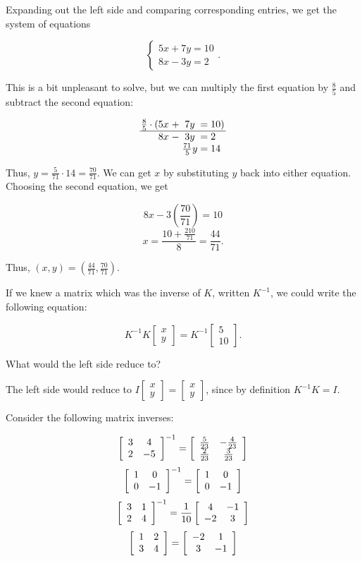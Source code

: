 \documentclass[../key.tex]{subfiles}
\begin{document}
Expanding out the left side and comparing corresponding entries, we get the system of equations

$$\begin{cases} 5x+7y = 10 \\ 8x-3y =2 \end{cases}.$$

This is a bit unpleasant to solve, but we can multiply the first equation by $\frac{8}{5}$ and subtract the second equation:

$$\arraycolsep=1.4pt\begin{array}{rcccl}
\frac{8}{5}\cdot (5x & + & 7y & = & 10) \\ \hline
8x & - & 3y & = & 2 \\
& & \frac{71}{5}y & = & 14 \\
\end{array}$$

Thus, $y=\frac{5}{71}\cdot 14 = \frac{70}{71}$. We can get $x$ by substituting $y$ back into either equation. Choosing the second equation, we get

$$8x-3\left(\frac{70}{71}\right)=10$$
$$x = \frac{10 + \frac{210}{71}}{8} = \frac{44}{71}.$$

Thus, $(x,y)=\left(\frac{44}{71},\frac{70}{71}\right)$.

\begin{inner_problem}
\item If we knew a matrix which was the inverse of $K$, written $K^{-1}$, we could write the following equation:

$$K^{-1}K\left[\begin{array}{c} x \\ y \end{array}\right]=K^{-1}\left[\begin{array}{c} 5 \\ 10 \end{array}\right].$$

What would the left side reduce to?
\end{inner_problem}

The left side would reduce to $I\left[\begin{array}{c} x \\ y \end{array}\right]=\left[\begin{array}{c} x \\ y \end{array}\right]$, since by definition $K^{-1}K=I$.

\begin{outer_problem}
\item Consider the following matrix inverses:

$$\left[\begin{array}{cc} 3 & 4 \\ 2 & -5 \end{array}\right]^{-1}=\left[\begin{array}{cc} \frac{5}{23} & -\frac{4}{23} \\ \frac{2}{23} & \frac{3}{23} \end{array}\right]$$
$$\left[\begin{array}{cc} 1 & 0 \\ 0 & -1 \end{array}\right]^{-1}=\left[\begin{array}{cc} 1 & 0 \\ 0 & -1 \end{array}\right]$$
$$\left[\begin{array}{cc} 3 & 1 \\ 2 & 4 \end{array}\right]^{-1}=\frac{1}{10}\left[\begin{array}{cc} 4 & -1 \\ -2 & 3 \end{array}\right]$$
$$\left[\begin{array}{cc} 1 & 2 \\ 3 & 4 \end{array}\right] = \left[\begin{array}{cc} -2 & 1 \\ 3 & -1 \end{array}\right]$$
\end{outer_problem}
\end{document}
